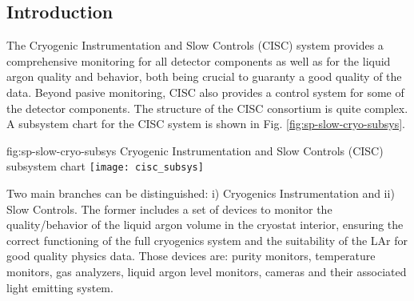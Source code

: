 \subsection{Introduction}
\label{sec:fdsp-slow-cryo-intro}



The Cryogenic Instrumentation and Slow Controls (CISC) system provides
a comprehensive monitoring for all detector components as well as for the liquid argon quality and behavior, both being crucial
to guaranty a good quality of the data. Beyond pasive monitoring, CISC also provides a control system for some of the detector components. 
The structure of the CISC consortium is quite complex. A subsystem chart
for the CISC system is shown in Fig. \ref{fig:sp-slow-cryo-subsys}. 

\begin{dunefigure}{fig:sp-slow-cryo-subsys}
{Cryogenic Instrumentation and Slow Controls (CISC) subsystem chart}
\texttt{[image: cisc\_subsys]}
\end{dunefigure}

Two main branches can be distinguished: i) Cryogenics Instrumentation and ii) Slow Controls. The former includes a set of devices 
to monitor the quality/behavior of the liquid argon volume in the cryostat interior, ensuring the correct functioning of
the full cryogenics system and the suitability of the LAr for good quality physics data. Those devices are:
purity monitors, temperature monitors, gas analyzers, liquid argon level monitors, cameras and their associated
light emitting system.

